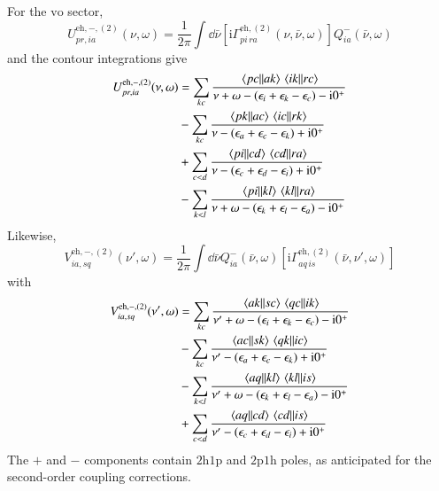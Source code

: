 \documentclass[aip,jcp,reprint,noshowkeys,superscriptaddress]{revtex4-1}
\newcommand{\eps}{\epsilon}
\newcommand{\ii}{\mathrm{i}}
\newcommand{\hhp}{\text{2h1p}}
\newcommand{\pph}{\text{2p1h}}
\newcommand{\eh}{\text{eh}}
\begin{document}
For the $\text{vo}$ sector,
\begin{equation}
    U^{\eh,-,(2)}_{pr,ia}(\nu,\omega)
    =
    \frac{1}{2\pi}
    \int\dd{\bar\nu}
    \left[
    \ii\Gamma^{\eh,(2)}_{pi\,ra}(\nu,\bar\nu,\omega)
    \right]
    Q^-_{ia}(\bar\nu,\omega)
    \label{eq:U_eh_second_minus_def}
\end{equation}
and the contour integrations give
\begin{equation}
    \begin{split}
    U^{\eh,-,(2)}_{pr,ia}(\nu,\omega)
    & =
    \sum_{kc}
    \frac{\mel{pc}{}{ak}\mel{ik}{}{rc}}
    {\nu+\omega-(\eps_i+\eps_k-\eps_c)-\ii0^+}
    \\
    &-
    \sum_{kc}
    \frac{\mel{pk}{}{ac}\mel{ic}{}{rk}}
    {\nu-(\eps_a+\eps_c-\eps_k)+\ii0^+}
    \\
    &+
    \sum_{c<d}
    \frac{\mel{pi}{}{cd}\mel{cd}{}{ra}}
    {\nu-(\eps_c+\eps_d-\eps_i)+\ii0^+}
    \\
    &-
    \sum_{k<l}
    \frac{\mel{pi}{}{kl}\mel{kl}{}{ra}}
    {\nu+\omega-(\eps_k+\eps_l-\eps_a)-\ii0^+}
    \end{split}
    \label{eq:U_eh_second_minus_explicit}
\end{equation}
Likewise,
\begin{equation}
    V^{\eh,-,(2)}_{ia,sq}(\nu',\omega)
    =
    \frac{1}{2\pi}
    \int\dd{\bar\nu}
    Q^-_{ia}(\bar\nu,\omega)
    \left[
    \ii\Gamma^{\eh,(2)}_{aq\,is}(\bar\nu,\nu',\omega)
    \right]
    \label{eq:V_eh_second_minus_def}
\end{equation}
with
\begin{equation}
    \begin{split}
    V^{\eh,-,(2)}_{ia,sq}(\nu',\omega)
    & =
    \sum_{kc}
    \frac{\mel{ak}{}{sc}\mel{qc}{}{ik}}
    {\nu'+\omega-(\eps_i+\eps_k-\eps_c)-\ii0^+}
    \\
    &-
    \sum_{kc}
    \frac{\mel{ac}{}{sk}\mel{qk}{}{ic}}
    {\nu'-(\eps_a+\eps_c-\eps_k)+\ii0^+}
    \\
    &-
    \sum_{k<l}
    \frac{\mel{aq}{}{kl}\mel{kl}{}{is}}
    {\nu'+\omega-(\eps_k+\eps_l-\eps_a)-\ii0^+}
    \\
    &+
    \sum_{c<d}
    \frac{\mel{aq}{}{cd}\mel{cd}{}{is}}
    {\nu'-(\eps_c+\eps_d-\eps_i)+\ii0^+}
    \end{split}
    \label{eq:V_eh_second_minus_explicit}
\end{equation}
The $+$ and $-$ components contain $\hhp$ and $\pph$ poles,
as anticipated for the second-order coupling corrections.
\end{document}
